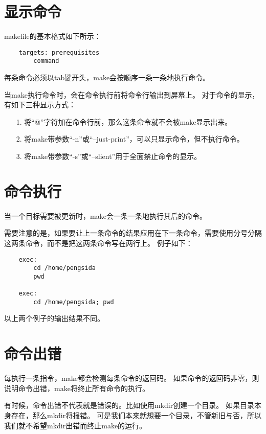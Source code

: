 \documentclass[a4paper,left=2.5cm,right=2.5cm,11pt]{article}
\begin{document}
\tableofcontents

\clearpage

\section{显示命令}
	makefile的基本格式如下所示：
	\begin{lstlisting}
	targets: prerequisites
		command
	\end{lstlisting}

	每条命令必须以tab键开头，make会按顺序一条一条地执行命令。\par

	当make执行命令时，会在命令执行前将命令行输出到屏幕上。
	对于命令的显示，有如下三种显示方式：
	\begin{itemize}
		\item[1.] 将“@”字符加在命令行前，那么这条命令就不会被make显示出来。
		\item[2.] 将make带参数“-n”或“--just-print”，可以只显示命令，但不执行命令。
		\item[3.] 将make带参数“-s”或“--slient”用于全面禁止命令的显示。
	\end{itemize}

\section{命令执行}
	当一个目标需要被更新时，make会一条一条地执行其后的命令。\par
	需要注意的是，如果要让上一条命令的结果应用在下一条命令，需要使用分号分隔这两条命令，而不是把这两条命令写在两行上。
	例子如下：
	\begin{lstlisting}
	exec:
		cd /home/pengsida
		pwd

	exec:
		cd /home/pengsida; pwd
	\end{lstlisting}

	以上两个例子的输出结果不同。

\section{命令出错}
	每执行一条指令，make都会检测每条命令的返回码。
	如果命令的返回码非零，则说明命令出错，make将终止所有命令的执行。\par

	有时候，命令出错不代表就是错误的。比如使用mkdir创建一个目录。
	如果目录本身存在，那么mkdir将报错。
	可是我们本来就想要一个目录，不管新旧与否，所以我们就不希望mkdir出错而终止make的运行。\par
\end{document}
